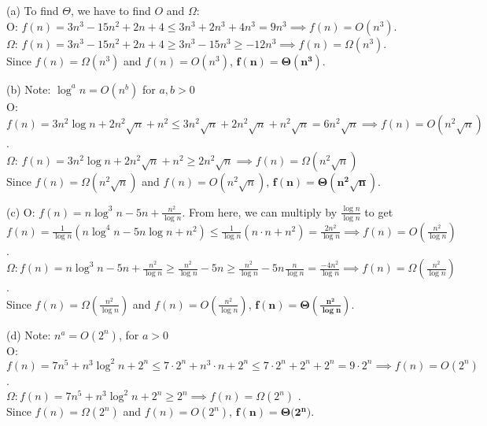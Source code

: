 \documentclass[11pt]{article}
\begin{document}
\begin{solution}

\begin{description}

\item{(a)} To find $\Theta$, we have to find $O$ and $\Omega$: 
\\ O: $f(n) = 3n^3 - 15n^2 + 2n + 4 \leq 3n^3 + 2n^3 + 4n^3 = 9n^3 \implies f(n) = O(n^3)$.
\\ $\Omega$: $f(n) = 3n^3 - 15n^2 + 2n + 4 \geq 3n^3 - 15n^3 \geq -12n^3 \implies f(n) = \Omega(n^3).$
\\ Since $f(n) = \Omega(n^3)$ and $f(n) = O(n^3)$, $\mathbf{f(n) = \Theta(n^3)}$.

\item{(b)} Note: $\log^a{n} = O(n^b)$ for $ a,b > 0$
\\ O: $f(n) = 3n^2\log{n} + 2n^2\sqrt{n} + n^2 \leq 3n^2\sqrt{n} + 2n^2\sqrt{n} + n^2\sqrt{n} = 6n^2\sqrt{n} \implies f(n) = O(n^2\sqrt{n})$.
\\ $\Omega$: $f(n) = 3n^2\log{n} + 2n^2\sqrt{n} + n^2 \geq 2n^2\sqrt{n} \implies f(n) = \Omega(n^2\sqrt{n})$
\\ Since $f(n) = \Omega(n^2\sqrt{n})$ and $f(n) = O(n^2\sqrt{n})$, $\mathbf{f(n) = \Theta(n^2\sqrt{n})}$.

\item{(c)} O: $f(n) = n\log^3{n} - 5n + \frac{n^2}{\log{n}}.$ From here, we can multiply by $\frac{\log{n}}{\log{n}}$ to get \\ $f(n) = \frac{1}{\log{n}}(n\log^4{n} - 5n\log{n} + n^2) \leq \frac{1}{\log{n}}(n\cdot n + n^2) = \frac{2n^2}{\log{n}} \implies f(n) = O(\frac{n^2}{\log{n}})$.
\\$\Omega: f(n) = n\log^3{n} - 5n + \frac{n^2}{\log{n}} \geq \frac{n^2}{\log{n}} - 5n \geq \frac{n^2}{\log{n}} - 5n\frac{n}{\log{n}} = \frac{-4n^2}{\log{n}} \implies f(n) = \Omega(\frac{n^2}{\log{n}})$.
\\ Since $f(n) = \Omega(\frac{n^2}{\log{n}})$ and $f(n) = O(\frac{n^2}{\log{n}})$, $\mathbf{f(n) = \Theta(\frac{n^2}{\log{n}})}$.

\item{(d)} Note: $n^a = O(2^n)$, for $a > 0$
\\ O: $f(n) = 7n^5 + n^3 \log^2 n + 2^n \leq 7\cdot 2^n + n^3 \cdot n + 2^n \leq 7\cdot 2^n + 2^n + 2^n = 9\cdot 2^n \implies f(n) = O(2^n)$.
\\ $\Omega: f(n) = 7n^5 + n^3 \log^2 n + 2^n \geq 2^n \implies f(n) = \Omega (2^n)$   .
\\ Since $f(n) = \Omega(2^n)$ and $f(n) = O(2^n)$, $\mathbf{f(n) = \Theta(2^n})$.


\end{description}
\end{solution}
\end{document}
